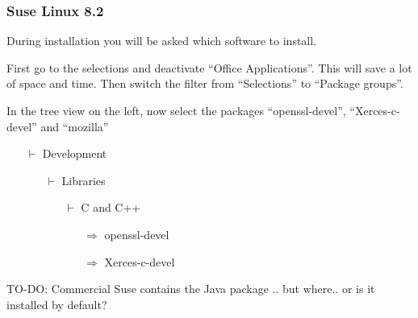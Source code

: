 \documentclass{article}
\begin{document}
\subsubsection{Suse Linux 8.2}

During installation you will be asked which software to install.

First go to the selections and deactivate ``Office Applications''.
This will save a lot of space and time.  Then switch the filter from
``Selections'' to ``Package groups''.

\parbox{\textwidth}{
  In the tree view on the left, now select the packages ``openssl-devel'', ``Xerces-c-devel''
and ``mozilla''
  \begin{itemize}
  \item[$\vdash$] Development
    \begin{itemize}
    \item[$\vdash$] Libraries
      \begin{itemize}
      \item[$\vdash$] C and C++
        
        
        \begin{itemize}
        \item[$\Rightarrow$] openssl-devel
          
        \item[$\Rightarrow$] Xerces-c-devel
        \end{itemize}
        
      \end{itemize}
    \end{itemize}
  \end{itemize}
}\par

TO-DO: Commercial Suse contains the Java package .. but where.. or is
it installed by default?
\end{document}
